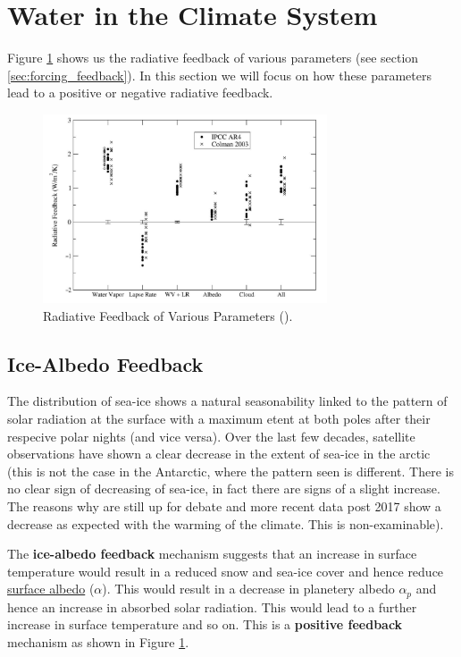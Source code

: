 \section{Water in the Climate System}
\label{sec:water_in_climate}

Figure \ref{fig:soden_held} shows us the radiative feedback of various parameters (see section \ref{sec:forcing_feedback}).
In this section we will focus on how these parameters lead to a positive or negative radiative feedback.

\begin{figure}[h]
    \centering
    \includegraphics[width=0.75\textwidth]{figures/Soden and Held 2006.png}
    \caption{Radiative Feedback of Various Parameters (\cite[Soden and Held 2006]{soden_held_2006}).}
    \label{fig:soden_held}
\end{figure}

\subsection{Ice-Albedo Feedback}
\label{sec:ice_albedo_feedback}

The distribution of sea-ice shows a natural seasonability linked to the pattern of solar radiation at the surface with a
maximum etent at both poles after their respecive polar nights (and vice versa). Over the last few decades, satellite
observations have shown a clear decrease in the extent of sea-ice in the arctic (this is not the case in the Antarctic,
where the pattern seen is different. There is no clear sign of decreasing of sea-ice, in fact there are signs of a slight
increase. The reasons why are still up for debate and more recent data post 2017 show a decrease as expected with the
warming of the climate. This is non-examinable).

The \textbf{ice-albedo feedback} mechanism suggests that an increase in surface temperature would result in a reduced 
snow and sea-ice cover and hence reduce \hyperlink{albedo}{surface albedo} ($\alpha$). This would result in a decrease in
planetery albedo $\alpha_p$ and hence an increase in absorbed solar radiation. This would lead to a further increase in
surface temperature and so on. This is a \textbf{positive feedback} mechanism as shown in Figure \ref{fig:soden_held}.


